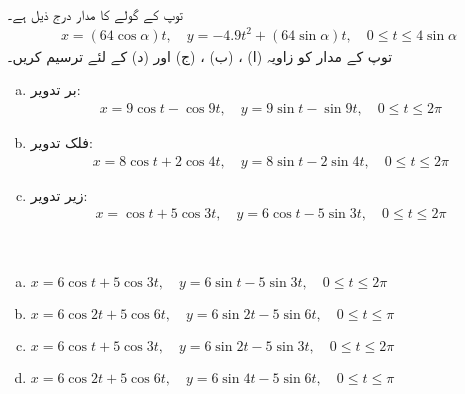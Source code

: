 \\
توپ کے  گولے کا مدار درج ذیل ہے۔
\begin{align*}
x=(64\cos \alpha)t,\quad y=-4.9t^2+(64\sin\alpha)t,\quad 0\le t\le 4\sin \alpha
\end{align*}
توپ کے مدار کو زاویہ (ا) ، (ب) ، (ج)  اور (د)   کے لئے ترسیم کریں۔
\\
\begin{enumerate}[a.]
\item
بر تدویر:
\begin{align*}
x=9\cos t-\cos 9t,\quad y=9\sin t-\sin 9t,\quad 0\le t\le 2\pi
\end{align*}
\item
فلک تدویر:
\begin{align*}
x=8\cos t+2\cos 4t,\quad y=8\sin t-2\sin 4t,\quad 0\le t\le 2\pi
\end{align*}
\item
زیر تدویر:
\begin{align*}
x=\cos t+5\cos 3t,\quad y=6\cos t-5\sin 3t,\quad 0\le t\le 2\pi
\end{align*}
\end{enumerate}
\\
\begin{enumerate}[a.]
\item
$x=6\cos t+5\cos 3t,\quad y=6\sin t-5\sin 3t,\quad 0\le t\le 2\pi$
\item
$x=6\cos 2t+5\cos 6t,\quad y=6\sin 2t-5\sin 6t,\quad 0\le t\le \pi$
\item
$x=6\cos t+5\cos 3t,\quad y=6\sin 2t-5\sin 3t,\quad 0\le t\le 2\pi$
\item
$x=6\cos 2t+5\cos 6t,\quad y=6\sin 4t-5\sin 6t,\quad 0\le t\le \pi$
\end{enumerate}
